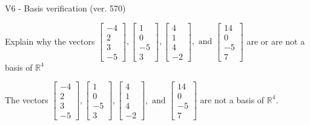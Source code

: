 \begin{exercise}
  \begin{exerciseTitle}V6 - Basis verification (ver. 570)\end{exerciseTitle}
  \begin{exerciseStatement}
    Explain why the vectors \(\left[\begin{array}{r}
-4 \\
2 \\
3 \\
-5
\end{array}\right] , \left[\begin{array}{r}
1 \\
0 \\
-5 \\
3
\end{array}\right] , \left[\begin{array}{r}
4 \\
1 \\
4 \\
-2
\end{array}\right] , \text{ and } \left[\begin{array}{r}
14 \\
0 \\
-5 \\
7
\end{array}\right]\) are or are not a basis of \(\mathbb{R}^4\)	


  \end{exerciseStatement}
  \begin{exerciseAnswer}
   The vectors \(\left[\begin{array}{r}
-4 \\
2 \\
3 \\
-5
\end{array}\right] , \left[\begin{array}{r}
1 \\
0 \\
-5 \\
3
\end{array}\right] , \left[\begin{array}{r}
4 \\
1 \\
4 \\
-2
\end{array}\right] , \text{ and } \left[\begin{array}{r}
14 \\
0 \\
-5 \\
7
\end{array}\right]\) 
  	 are not  a basis of \(\mathbb{R}^4\).
  


  \end{exerciseAnswer}
\end{exercise}